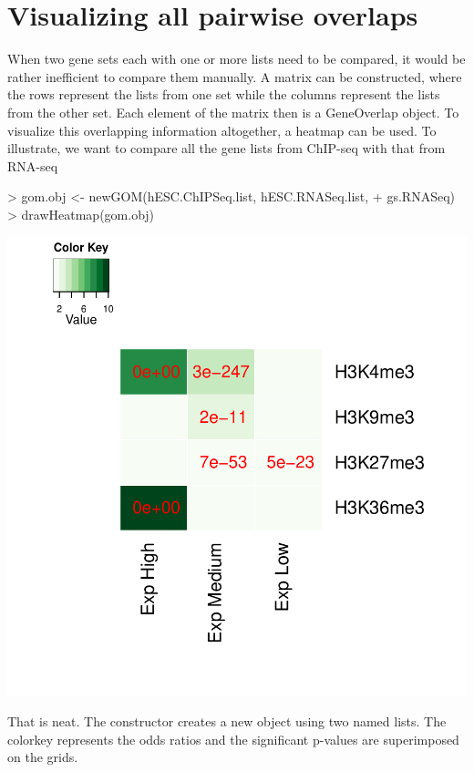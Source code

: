 \documentclass{article}
\begin{document}
\section{Visualizing all pairwise overlaps} \label{sec:vis}
When two gene sets each with one or more lists need to be compared, it would be rather inefficient to compare them manually. A matrix can be constructed, where the rows represent the lists from one set while the columns represent the lists from the other set. Each element of the matrix then is a GeneOverlap object. To visualize this overlapping information altogether, a heatmap can be used. To illustrate, we want to compare all the gene lists from ChIP-seq with that from RNA-seq
\begin{Schunk}
\begin{Sinput}
> gom.obj <- newGOM(hESC.ChIPSeq.list, hESC.RNASeq.list, 
+                   gs.RNASeq)
> drawHeatmap(gom.obj)
\end{Sinput}
\end{Schunk}
\includegraphics{GeneOverlap-013}
\begin{flushleft}
That is neat. The  constructor creates a new  object using two named lists. The colorkey represents the odds ratios and the significant p-values are superimposed on the grids.
\end{flushleft}
\end{document}
